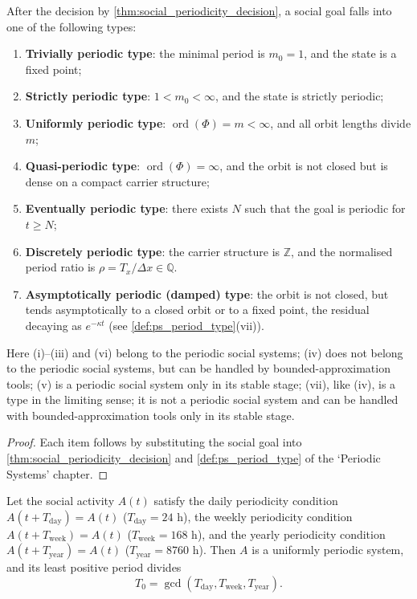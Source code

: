 \begin{corollary}\label{cor:social_period_type}
After the decision by \cref{thm:social_periodicity_decision}, a social goal falls into one of the following types:
\begin{enumerate}[label=(\roman*)]
    \item \textbf{Trivially periodic type}: the minimal period is $m_0=1$, and the state is a fixed point;
    \item \textbf{Strictly periodic type}: $1<m_0<\infty$, and the state is strictly periodic;
    \item \textbf{Uniformly periodic type}: $\operatorname{ord}(\Phi)=m<\infty$, and all orbit lengths divide $m$;
    \item \textbf{Quasi-periodic type}: $\operatorname{ord}(\Phi)=\infty$, and the orbit is not closed but is dense on a compact carrier structure;
    \item \textbf{Eventually periodic type}: there exists $N$ such that the goal is periodic for $t\ge N$;
    \item \textbf{Discretely periodic type}: the carrier structure is $\mathbb Z$, and the normalised period ratio is $\rho=T_x/\Delta x\in\mathbb Q$.
    \item \textbf{Asymptotically periodic (damped) type}: the orbit is not closed, but tends asymptotically to a closed orbit or to a fixed point, the residual decaying as $e^{-\kappa t}$ (see \cref{def:ps_period_type}(vii)).
\end{enumerate}
Here (i)--(iii) and (vi) belong to the periodic social systems; (iv) does not belong to the periodic social systems, but can be handled by bounded-approximation tools; (v) is a periodic social system only in its stable stage; (vii), like (iv), is a type in the limiting sense; it is not a periodic social system and can be handled with bounded-approximation tools only in its stable stage.
\end{corollary}

\begin{proof}
Each item follows by substituting the social goal into \cref{thm:social_periodicity_decision} and \cref{def:ps_period_type} of the `Periodic Systems' chapter.
\end{proof}

\begin{lemma}\label{lem:social_rhythm_periodic}
Let the social activity $A(t)$ satisfy the daily periodicity condition $A(t+T_{\text{day}})=A(t)$ ($T_{\text{day}}=24$ h), the weekly periodicity condition $A(t+T_{\text{week}})=A(t)$ ($T_{\text{week}}=168$ h), and the yearly periodicity condition $A(t+T_{\text{year}})=A(t)$ ($T_{\text{year}}=8760$ h). Then $A$ is a uniformly periodic system, and its least positive period divides
\[
T_0=\gcd(T_{\text{day}},T_{\text{week}},T_{\text{year}}).
\]
\end{lemma}

